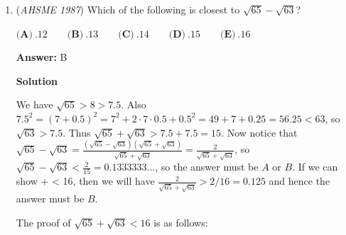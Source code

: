 \begin{enumerate}
 



\textbf{Solution 2 (a little faster)}

Let $a$ and $g$ denote the widths of an algebra and geometry textbook, respectively. As in Solution 1, observe that the width of the shelf is equal to the following: 

 
 \[Ea=Aa+Hg=Sa+Mg.\]

 The rest is simply algebra: 

 \begin{align*}(E-A)a&=Hg \\g&=\dfrac{(E-A)a}H \\Ea&=Sa+M\left(\dfrac{(E-A)a}H\right) \\&=Sa+\dfrac{M(E-A)a}H \\E&=S+\dfrac{M(E-A)}H \\&=\dfrac{SH+ME-MA}H \\EH&=SH+ME-MA \\E(H-M)&=SH-MA \\E&=\dfrac{SH-MA}{H-M} \\&=\dfrac{AM-SH}{M-H}. \\\end{align*}


 This is answer choice $\boxed{\textbf{(D)}}$. QED. $\Box$



	\item (\textit{AHSME 1987}) Which of the following is closest to $\sqrt{65}-\sqrt{63}$?


 $\textbf{(A)}\ .12 \qquad \textbf{(B)}\ .13 \qquad \textbf{(C)}\ .14 \qquad \textbf{(D)}\ .15 \qquad \textbf{(E)}\ .16$

 \textbf{Answer: }B



\textbf{Solution}

We have $\sqrt{65} > 8 > 7.5$. Also $7.5^2 = (7 + 0.5)^2 = 7^2 + 2 \cdot 7 \cdot 0.5 + 0.5^2 = 49 + 7 + 0.25 = 56.25 < 63$, so $\sqrt{63} > 7.5$. Thus $\sqrt{65} + \sqrt{63} > 7.5 + 7.5 = 15$. Now notice that $\sqrt{65} - \sqrt{63} = \frac{(\sqrt{65} - \sqrt{63})(\sqrt{65} + \sqrt{63})}{\sqrt{65} + \sqrt{63}} = \frac{2}{\sqrt{65} + \sqrt{63}}$, so $\sqrt{65} - \sqrt{63} < \frac{2}{15} = 0.1333333...$, so the answer must be $A$ or $B$. If we can show  +  < 16, then we will have $\frac{2}{\sqrt{65} + \sqrt{63}} > 2/16 = 0.125$ and hence the answer must be $B$. 

 
The proof of $\sqrt{65} + \sqrt{63} < 16$ is as follows:


\end{enumerate}
